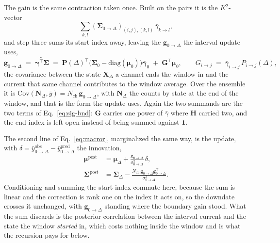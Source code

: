 \begin{appendixbox}
The gain is the same contraction taken once. Built on the pairs it is the $K^2$-vector
\[
  \sum_{k,l}(\bm{\Sigma}_{0\to\Delta})_{(i,j),(k,l)}\,\bar{\gamma}_{k\to l},
\]
and step three sums its start index away, leaving the
$\mathbf{g}_{0\to\Delta}$ the interval update uses,
\begin{equation}
  \mathbf{g}_{0\to\Delta} \;=\; \widetilde{\bm{\gamma}^\top\bm{\Sigma}}
  \;=\; \mathbf{P}(\Delta)^\top\bigl(\bm{\Sigma}_0-\mathrm{diag}(\bm{\mu}_0)\bigr)\bar{\bm{\gamma}}_0
  \;+\; \mathbf{G}^\top\bm{\mu}_0,
  \qquad
  G_{i\to j} \;=\; \bar{\gamma}_{i\to j}\,P_{i\to j}(\Delta),
  \label{eq:vector-tilde}
\end{equation}
the covariance between the state $\mathbf{X}_\Delta$ a channel ends the window in and the
current that same channel contributes to the window average. Over the ensemble it is
$\mathrm{Cov}(\mathbf{N}_\Delta,\bar{y})=N_{\mathrm{ch}}\,\mathbf{g}_{0\to\Delta}$, with $\mathbf{N}_\Delta$
the counts by state at the end of the window, and that is the form the update uses.
Again the two summands are the two terms of Eq.~\ref{eq:sig-bnd}:
$\mathbf{G}$ carries one power of $\bar{\gamma}$ where $\mathbf{H}$ carried two, and the
end index is left open instead of being summed against $\mathbf{1}$.

The second line of Eq.~\ref{eq:macror}, marginalized the same way, is the update, with
$\delta = \bar{y}^{\mathrm{obs}}_{0\to\Delta} - \bar{y}^{\mathrm{pred}}_{0\to\Delta}$ the innovation,
\begin{align}
  \bm{\mu}^{\mathrm{post}} &= \bm{\mu}_\Delta + \frac{\mathbf{g}_{0\to\Delta}}{\sigma^2_{0\to\Delta}}\,\delta, \label{eq:mu-post}\\
  \bm{\Sigma}^{\mathrm{post}} &= \bm{\Sigma}_\Delta - \frac{N_{\mathrm{ch}}\,\mathbf{g}_{0\to\Delta}\mathbf{g}_{0\to\Delta}^\top}{\sigma^2_{0\to\Delta}}. \label{eq:sig-post}
\end{align}
Conditioning and summing the start index commute here, because the sum is linear and the
correction is rank one on the index it acts on, so the downdate crosses it unchanged, with
$\mathbf{g}_{0\to\Delta}$ standing where the boundary gain stood. What the sum discards is the posterior correlation
between the interval current and the state the window \emph{started} in, which costs nothing
inside the window and is what the recursion pays for below.


\end{appendixbox}
